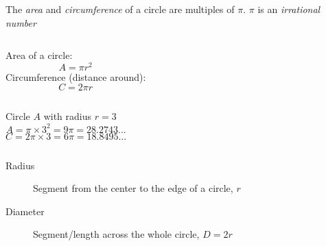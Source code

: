 \begin{frame}{The \emph{area} and  \emph{circumference} of a circle are multiples of $\pi$.}
    {$\pi$ is an \emph{irrational number}}
    \begin{columns}
            Area of a circle:
            {\large $$A=\pi r^2$$}
            Circumference (distance around):
            {\large $$C=2 \pi r$$}
        \end{columns}  \vspace{0.5cm}
        \begin{columns}
            Circle $A$ with radius $r=3$
            $$A = \pi \times 3^2 = 9 \pi = 28.2743... $$
            $$C = 2\pi \times 3 = 6 \pi = 18.8495... $$
        \end{columns} \vspace{0.5cm}
        \begin{description}
            \item[Radius] Segment from the center to the edge of a circle, $r$
            \item[Diameter] Segment/length across the whole circle, $D=2r$
        \end{description}
    \end{frame}

